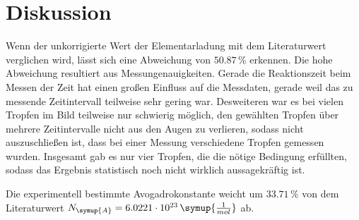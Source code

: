 \section{Diskussion}
\label{sec:Diskussion}

Wenn der unkorrigierte Wert der Elementarladung mit dem Literaturwert verglichen wird, lässt sich eine Abweichung von $50.87 \,\%$ erkennen. Die hohe 
Abweichung resultiert aus Messungenauigkeiten. Gerade die Reaktionszeit beim Messen der Zeit hat einen großen Einfluss auf die Messdaten, gerade weil
das zu messende Zeitintervall teilweise sehr gering war. Desweiteren war es bei vielen Tropfen im Bild teilweise nur schwierig möglich, den gewählten 
Tropfen über mehrere Zeitintervalle nicht aus den Augen zu verlieren, sodass nicht auszuschließen ist, dass bei einer Messung verschiedene Tropfen 
gemessen wurden. Insgesamt gab es nur vier Tropfen, die die nötige Bedingung erfüllten, sodass das Ergebnis statistisch noch nicht wirklich aussagekräftig ist.

Die experimentell bestimmte Avogadrokonstante weicht um $33.71\,\%$ von dem Literaturwert $N_{\symup{A}}=6.0221 \cdot10^{23} \,\symup{\frac{1}{mol}}$ 
\cite{avo} ab.
